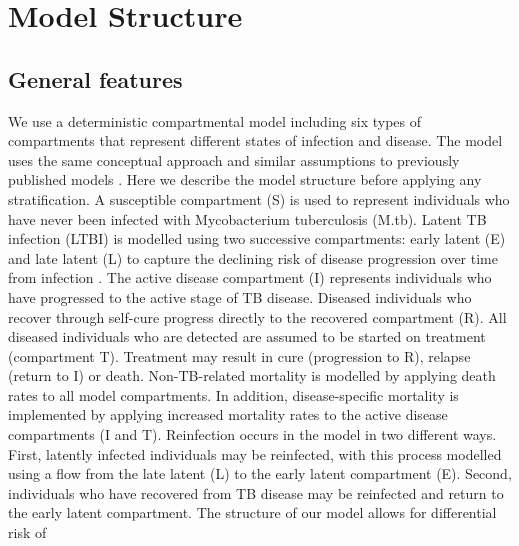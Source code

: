 
\section{Model Structure}

\subsection{General features}

We use a deterministic compartmental model including six types of compartments that represent 
different states of infection and disease. The model uses the same conceptual approach and similar 
assumptions to previously published models \cite{trauer-2017, ragonnet-2019, ragonnet-2021, ragonnet-2022}. 
Here we describe the model structure before applying any stratification. 
\newline
A susceptible compartment (S) is used to represent individuals who have 
never been infected with Mycobacterium tuberculosis (M.tb). Latent TB infection (LTBI) is modelled 
using two successive compartments: early latent (E) and late latent (L) to capture the declining risk of 
disease progression over time from infection \cite{ragonnet-2017}. The active disease compartment (I) represents 
individuals who have progressed to the active stage of TB disease. Diseased individuals who recover 
through self-cure progress directly to the recovered compartment (R). All diseased individuals who 
are detected are assumed to be started on treatment (compartment T). Treatment may result in cure 
(progression to R), relapse (return to I) or death.
\newline
Non-TB-related mortality is modelled by applying death rates to all model compartments. In addition, 
disease-specific mortality is implemented by applying increased mortality rates to the active disease 
compartments (I and T).
\newline
Reinfection occurs in the model in two different ways. First, latently infected individuals may be 
reinfected, with this process modelled using a flow from the late latent (L) to the early latent 
compartment (E). Second, individuals who have recovered from TB disease may be reinfected and 
return to the early latent compartment. The structure of our model allows for differential risk of 
